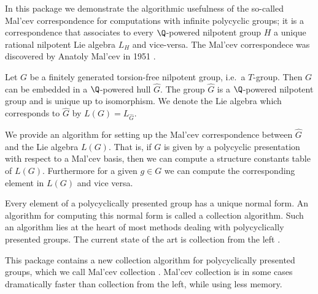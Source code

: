 

In this package we demonstrate the algorithmic usefulness of the
so-called Mal'cev correspondence for computations with infinite polycyclic
groups; it is a correspondence
that associates to every $\Q$-powered nilpotent group $H$ a
unique rational nilpotent Lie algebra $L_H$ and vice-versa.
The Mal'cev correspondece was discovered 
by Anatoly Mal'cev in 1951 \cite{Mal51}.


Let $G$ be a finitely generated torsion-free nilpotent group, 
i.e.\ a $T$-group.
Then $G$ can be embedded in a $\Q$-powered hull $\hat{G}$.
The group $\hat{G}$ is
a $\Q$-powered nilpotent group and  
is unique up to isomorphism. 
We denote the Lie algebra
which corresponds to $\hat{G}$ by
$L(G)= L_{\hat{G}}$.

We provide an algorithm for setting up the 
Mal'cev correspondence
between $\hat{G}$ and the Lie algebra $L(G)$. 
That is, if $G$
is given by a polycyclic presentation with respect to a Mal'cev basis,
then we can compute a structure constants table of $L(G)$.
Furthermore for a given $g\in G$ we can compute the corresponding 
element in $L(G)$ and vice versa. 


Every element of a
polycyclically presented
group has a unique normal form. An algorithm for computing this normal
form is called a collection algorithm. Such an algorithm
lies at the heart of most methods
dealing with polycyclically presented groups. The current state of
the art is collection from the left 
\cite{Geb02,LGS90,VLe90}.

This package contains
a new collection algorithm for polycyclically presented groups,
which we call Mal'cev collection \cite{ALi07}.
Mal'cev collection is
in some cases dramatically faster than
collection from the left, while using less memory.







